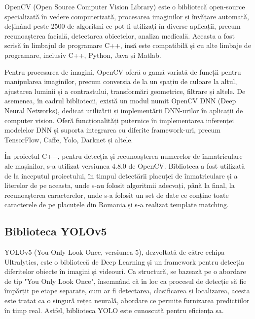 \documentclass[12pt]{article}
\begin{document}
OpenCV (Open Source Computer Vision Library) este o bibliotec\u{a} open-source specializat\u{a} \^{i}n vedere computerizat\u{a}, procesarea imaginilor și \^{i}nv\u{a}țare automat\u{a}, dețin\^{a}nd peste 2500 de algoritmi ce pot fi utilizați \^{i}n diverse aplicații, precum recunoașterea facial\u{a}, detectarea obiectelor, analiza medical\u{a}. Aceasta a fost scris\u{a} \^{i}n limbajul de programare C++, ins\u{a} este compatibil\u{a} și cu alte limbaje de programare, inclusiv C++, Python, Java și Matlab. \cite{opencv}

Pentru procesarea de imagini, OpenCV ofer\u{a} o gam\u{a} variat\u{a} de funcții pentru manipularea imaginilor, precum conversia de la un spațiu de culoare la altul, ajustarea luminii și a contrastului, transform\u{a}ri geometrice, filtrare și altele. De asemenea, \^{i}n cadrul bibliotecii, exist\u{a} un modul numit OpenCV DNN (Deep Neural Networks), dedicat utiliz\u{a}rii și implement\u{a}rii DNN-urilor \^{i}n aplicații de computer vision. Ofer\u{a} funcționalit\u{a}ți puternice \^{i}n implementarea inferenței modelelor DNN și suporta integrarea cu diferite framework-uri, precum TensorFlow, Caffe, Yolo, Darknet și altele.


\^{I}n proiectul C++, pentru detecția și recunoașterea numerelor de \^{i}nmatriculare ale mașinilor, s-a utilizat versiunea 4.8.0 de OpenCV. Biblioteca a fost utilizat\u{a} de la inceputul proiectului, \^{i}n timpul detect\u{a}rii placuței de \^{i}nmatriculare și a literelor de pe aceasta, unde s-au folosit algoritmii adecvați, p\^{a}n\u{a} la final, la recunoașterea caracterelor, unde s-a folosit un set de date ce conține toate caracterele de pe placuțele din Romania și s-a realizat template matching.

\subsection{Biblioteca YOLOv5}

YOLOv5 (You Only Look Once, versiunea 5), dezvoltat\u{a} de c\u{a}tre echipa Ultralytics, este o bibliotec\u{a} de Deep Learning și un framework pentru detecția diferitelor obiecte \^{i}n imagini și videouri. Ca structur\u{a}, se bazeaz\u{a} pe o abordare de tip "You Only Look Once", \^{i}nsemn\^{a}nd c\u{a} \^{i}n loc ca procesul de detecție s\u{a} fie \^{i}mp\u{a}rțit pe etape separate, cum ar fi detectarea, clasificarea și localizarea, acesta este tratat ca o singur\u{a} rețea neural\u{a}, abordare ce permite furnizarea predicțiilor \^{i}n timp real. Astfel, biblioteca YOLO este cunoscut\u{a} pentru eficiența sa. 
\end{document}
